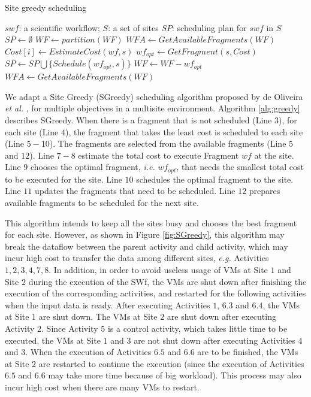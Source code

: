 \begin{algorithm}
\caption{Site greedy scheduling}\label{alg:greedy}
\begin{algorithmic}[1]
\INPUT $swf$: a scientific workflow; $S$: a set of sites
\OUTPUT $SP$: scheduling plan for $swf$ in $S$
\State $SP\gets \emptyset$
\State $WF\gets partition( WF )$ 
\State $WFA\gets GetAvailableFragments(WF)$ 
\State $Cost[i]\gets EstimateCost( wf, s )$ 
\EndFor
\State $wf_{opt} \gets GetFragment( s, Cost )$ 
\State $SP \gets SP \bigcup \{ Schedule(wf_{opt},s)\}$
\State $WF \gets WF - wf_{opt}$
\State $WFA \gets GetAvailableFragments(WF)$
\EndIf
\EndFor
\EndWhile
\ENDBEGIN
\end{algorithmic}
\end{algorithm}

We adapt a Site Greedy (SGreedy) scheduling algorithm proposed by de Oliveira \textit{et al.} \cite{Oliveira2012}, for multiple objectives in a multisite environment. Algorithm \ref{alg:greedy} describes SGreedy. When there is a fragment that is not scheduled (Line $3$), for each site (Line $4$), the fragment that takes the least cost is scheduled to each site (Line $5 - 10$). The fragments are selected from the available fragments (Line $5$ and $12$). Line $7-8$ estimate the total cost to execute Fragment $wf$ at the site. Line $9$ chooses the optimal fragment, \textit{i.e.} $wf_{opt}$, that needs the smallest total cost to be executed for the site. Line $10$ schedules the optimal fragment to the site. Line $11$ updates the fragments that need to be scheduled. Line $12$ prepares available fragments to be scheduled for the next site.

This algorithm intends to keep all the sites busy and chooses the best fragment for each site. However, as shown in Figure \ref{fig:SGreedy}, this algorithm may break the dataflow between the parent activity and child activity, which may incur high cost to transfer the data among different sites, \textit{e.g.} Activities $1, 2, 3, 4, 7, 8$. In addition, in order to avoid useless usage of VMs at Site $1$ and Site $2$ during the execution of the SWf, the VMs are shut down after finishing the execution of the corresponding activities, and restarted for the following activities when the input data is ready. After executing Activities $1$, $6.3$ and $6.4$, the VMs at Site $1$ are shut down. The VMs at Site $2$ are shut down after executing Activity $2$. Since Activity $5$ is a control activity, which takes little time to be executed, the VMs at Site $1$ and $3$ are not shut down after executing Activities $4$ and $3$. When the execution of Activities $6.5$ and $6.6$ are to be finished, the VMs at Site $2$ are restarted to continue the execution (since the execution of Activities $6.5$ and $6.6$ may take more time because of big workload). This process may also incur high cost when there are many VMs to restart.

